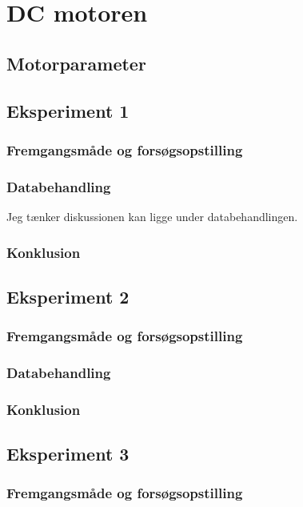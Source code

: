 



\section{DC motoren}

\subsection{Motorparameter}
\subsection{Eksperiment 1}
\subsubsection{Fremgangsmåde og forsøgsopstilling}
\subsubsection{Databehandling}
Jeg tænker diskussionen kan ligge under databehandlingen. 
\subsubsection{Konklusion}

\subsection{Eksperiment 2}
\subsubsection{Fremgangsmåde og forsøgsopstilling}
\subsubsection{Databehandling}
\subsubsection{Konklusion}


\subsection{Eksperiment 3}
\subsubsection{Fremgangsmåde og forsøgsopstilling}
